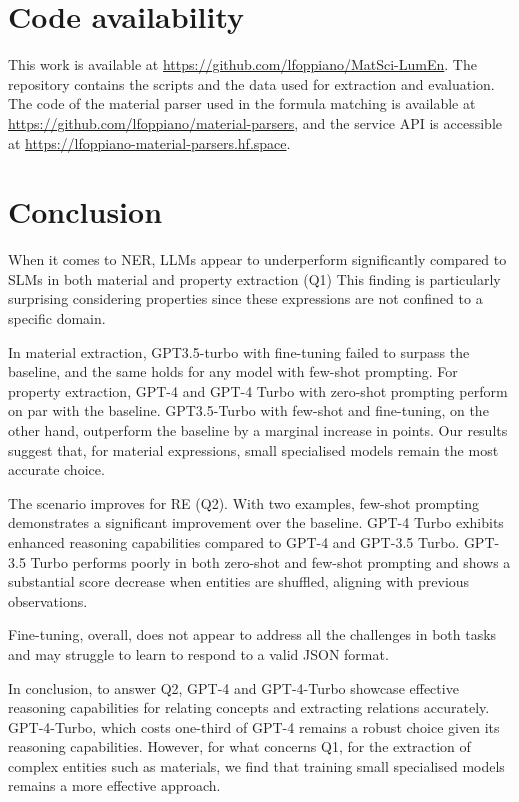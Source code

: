 \documentclass[a4paper]{article}
\begin{document}
\section{Code availability}
This work is available at \url{https://github.com/lfoppiano/MatSci-LumEn}. The repository contains the scripts and the data used for extraction and evaluation. 
The code of the material parser used in the formula matching is available at \url{https://github.com/lfoppiano/material-parsers}, and the service API is accessible at \url{https://lfoppiano-material-parsers.hf.space}. 

\section{Conclusion}

When it comes to NER, LLMs appear to underperform significantly compared to SLMs in both material and property extraction (Q1)
This finding is particularly surprising considering properties since these expressions are not confined to a specific domain.

In material extraction, GPT3.5-turbo with fine-tuning failed to surpass the baseline, and the same holds for any model with few-shot prompting. 
For property extraction, GPT-4 and GPT-4 Turbo with zero-shot prompting perform on par with the baseline. GPT3.5-Turbo with few-shot and fine-tuning, on the other hand, outperform the baseline by a marginal increase in points.
Our results suggest that, for material expressions, small specialised models remain the most accurate choice.

The scenario improves for RE (Q2).
With two examples, few-shot prompting demonstrates a significant improvement over the baseline.
GPT-4 Turbo exhibits enhanced reasoning capabilities compared to GPT-4 and GPT-3.5 Turbo.
GPT-3.5 Turbo performs poorly in both zero-shot and few-shot prompting and shows a substantial score decrease when entities are shuffled, aligning with previous observations.
    
Fine-tuning, overall, does not appear to address all the challenges in both tasks and may struggle to learn to respond to a valid JSON format.

In conclusion, to answer Q2, GPT-4 and GPT-4-Turbo showcase effective reasoning capabilities for relating concepts and extracting relations accurately. 
GPT-4-Turbo, which costs one-third of GPT-4 remains a robust choice given its reasoning capabilities. 
However, for what concerns Q1, for the extraction of complex entities such as materials, we find that training small specialised models remains a more effective approach.
\end{document}
